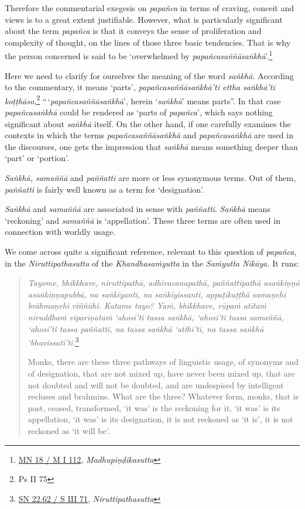 Therefore the commentarial exegesis on \emph{papañca} in terms of craving, conceit and views is to a great extent justifiable. However, what is particularly significant about the term \emph{papañca} is that it conveys the sense of proliferation and complexity of thought, on the lines of those three basic tendencies. That is why the person concerned is said to be `overwhelmed by \emph{papañcasaññāsaṅkhā}'.\footnote{\href{https://suttacentral.net/mn18/pli/ms}{MN 18 / M I 112}, \emph{Madhupiṇḍikasutta}}

Here we need to clarify for ourselves the meaning of the word \emph{saṅkhā.} According to the commentary, it means `parts', \emph{papañcasaññāsaṅkhā'ti ettha saṅkhā'ti koṭṭhāso,}\footnote{Ps II 75} ``\,`\emph{papañcasaññāsaṅkhā}', herein `\emph{saṅkhā}' means parts''. In that case \emph{papañcasaṅkhā} could be rendered as `parts of \emph{papañca}', which says nothing significant about \emph{saṅkhā} itself. On the other hand, if one carefully examines the contexts in which the terms \emph{papañcasaññāsaṅkhā} and \emph{papañcasaṅkhā} are used in the discourses, one gets the impression that \emph{saṅkhā} means something deeper than `part' or `portion'.

\emph{Saṅkhā, samaññā} and \emph{paññatti} are more or less synonymous terms. Out of them, \emph{paññatti} is fairly well known as a term for `designation'.

\emph{Saṅkhā} and \emph{samaññā} are associated in sense with \emph{paññatti}. \emph{Saṅkhā} means `reckoning' and \emph{samaññā} is `appellation'. These three terms are often used in connection with worldly usage.

We come across quite a significant reference, relevant to this question of \emph{papañca}, in the \emph{Niruttipathasutta} of the \emph{Khandhasaṁyutta} in the \emph{Saṁyutta Nikāya.} It runs:

\begin{quote}
\emph{Tayome, bhikkhave, niruttipathā, adhivacanapathā, paññattipathā asaṅkiṇṇā asaṅkiṇṇapubbā, na saṅkīyanti, na saṅkīyissanti, appaṭikuṭṭhā samaṇehi brāhmaṇehi viññūhi. Katame tayo? Yaṁ, bhikkhave, rūpaṁ atītaṁ niruddhaṁ vipariṇataṁ `ahosī'ti tassa saṅkhā, `ahosī'ti tassa samaññā, `ahosī'ti tassa paññatti, na tassa saṅkhā `atthī'ti, na tassa saṅkhā `bhavissatī'ti.}\footnote{\href{https://suttacentral.net/sn22.62/pli/ms}{SN 22.62 / S III 71}, \emph{Niruttipathasutta}}

Monks, there are these three pathways of linguistic usage, of synonyms and of designation, that are not mixed up, have never been mixed up, that are not doubted and will not be doubted, and are undespised by intelligent recluses and brahmins. What are the three? Whatever form, monks, that is past, ceased, transformed, `it was' is the reckoning for it, `it was' is its appellation, `it was' is its designation, it is not reckoned as `it is', it is not reckoned as `it will be'.
\end{quote}

